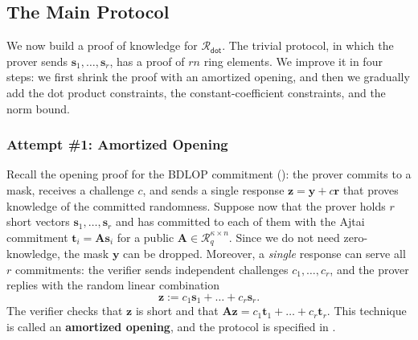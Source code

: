 \documentclass[../../book.tex]{subfiles}
\begin{document}
\subsection{The Main Protocol}\label{section:labrador-main}

We now build a proof of knowledge for $\mathcal{R}_{\mathsf{dot}}$.
The trivial protocol, in which the prover sends $\mathbf{s}_1, \dots, \mathbf{s}_r$, has a proof of $rn$ ring elements.
We improve it in four steps: we first shrink the proof with an amortized opening, and then we gradually add the dot product constraints, the constant-coefficient constraints, and the norm bound.

\subsubsection{Attempt \#1: Amortized Opening}

Recall the opening proof for the BDLOP commitment (): the prover commits to a mask, receives a challenge $c$, and sends a single response $\mathbf{z} = \mathbf{y} + c\mathbf{r}$ that proves knowledge of the committed randomness.
Suppose now that the prover holds $r$ short vectors $\mathbf{s}_1, \dots, \mathbf{s}_r$ and has committed to each of them with the Ajtai commitment $\mathbf{t}_i = \mathbf{A}\mathbf{s}_i$ for a public $\mathbf{A} \in \mathcal{R}_q^{\kappa \times n}$.
Since we do not need zero-knowledge, the mask $\mathbf{y}$ can be dropped.
Moreover, a \emph{single} response can serve all $r$ commitments: the verifier sends independent challenges $c_1, \dots, c_r$, and the prover replies with the random linear combination
\begin{equation*}
    \mathbf{z} := c_1\mathbf{s}_1 + \dots + c_r\mathbf{s}_r.
\end{equation*}
The verifier checks that $\mathbf{z}$ is short and that $\mathbf{A}\mathbf{z} = c_1\mathbf{t}_1 + \dots + c_r\mathbf{t}_r$.
This technique is called an \textbf{amortized opening}, and the protocol is specified in .
\end{document}

